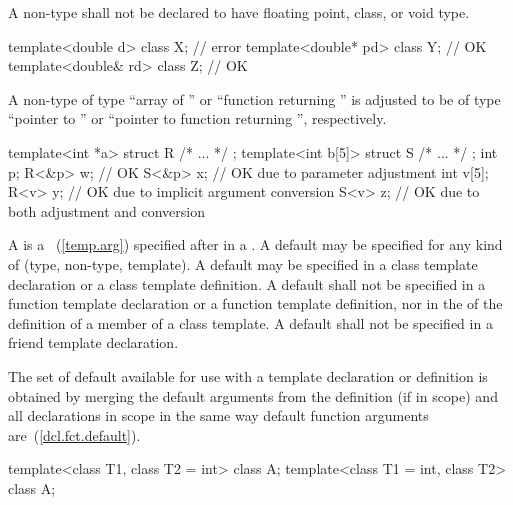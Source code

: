 \pnum
A non-type
shall not be declared to have floating point, class, or void type.
\enterexample

\begin{codeblock}
template<double d> class X;     // error
template<double* pd> class Y;   // OK
template<double& rd> class Z;   // OK
\end{codeblock}
\exitexampleb

\pnum
A non-type
of type ``array of
''
or ``function returning
''
is adjusted to be of type
``pointer to
''
or ``pointer to function returning
'',
respectively.
\enterexample

\begin{codeblock}
template<int *a>   struct R { /* ... */ };
template<int b[5]> struct S { /* ... */ };
int p;
R<&p> w;                        // OK
S<&p> x;                        // OK due to parameter adjustment
int v[5];
R<v> y;                         // OK due to implicit argument conversion
S<v> z;                         // OK due to both adjustment and conversion
\end{codeblock}
\exitexampleb

\pnum
A
is a
~(\ref{temp.arg}) specified after
\tcode{=}
in a
.
A default
may be specified for any kind of
(type, non-type, template).
A default
may be specified in a class template declaration or a class template
definition.
A default
shall not be specified in a function template declaration or a function
template definition, nor in the
of the definition of a member of a class template.
A default
shall not be specified in a friend template declaration.

\pnum
The set of default
available for use with a template
declaration or definition is obtained by merging the default arguments
from the definition (if in scope) and all declarations in scope in the
same way default function arguments are~(\ref{dcl.fct.default}).
\enterexample

\begin{codeblock}
template<class T1, class T2 = int> class A;
template<class T1 = int, class T2> class A;
\end{codeblock}

